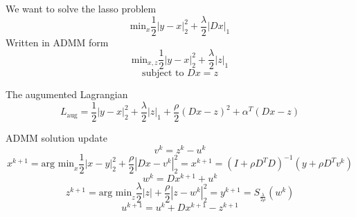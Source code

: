 \documentclass{article}
\begin{document}
We want to solve the lasso problem
\[
\textrm{min}_x\frac{1}{2}|y-x|^2_2+\frac{\lambda}{2}|Dx|_1
\]
Written in ADMM form
\[
\textrm{min}_{x,z}\frac{1}{2}|y-x|^2_2+\frac{\lambda}{2}|z|_1
\]
\[
\textrm{subject to } Dx=z 
\]

The augumented Lagrangian
\[
L_{\textrm{aug}}=\frac{1}{2}|y-x|^2_2+\frac{\lambda}{2}|z|_1+\frac{\rho}{2}(Dx-z)^2+\alpha^T(Dx-z)
\]

ADMM solution update
\[
v^k=z^k-u^k
\]
\[
x^{k+1}=\textrm{arg min}_x \frac{1}{2}|x-y|_2^2+\frac{\rho}{2}|Dx-v^k|_2^2=x^{k+1}=(I+\rho D^TD)^{-1}(y+\rho D^Tv^k)
\]
\[
w^k=Dx^{k+1}+u^k
\]
\[
z^{k+1}=\textrm{arg min}_z\frac{\lambda}{2}|z|+\frac{\rho}{2}|z-w^k|_2^2= y^{k+1}=S_{\frac{\lambda}{2\rho}}(w^k)
\]
\[
u^{k+1}=u^k+Dx^{k+1}-z^{k+1}
\]
\end{document}
